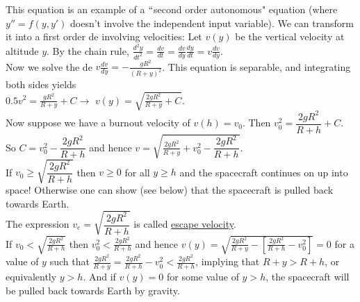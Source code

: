 \documentclass{ximera}
\begin{document}
 This equation is an example of a $``$second order autonomous" equation (where $y''=f(y,y')$ doesn't involve the independent input variable).   We can transform it into a first order de involving velocities: Let $v(y)$ be the vertical velocity at altitude $y$.   By the chain rule, $\displaystyle \frac{d^{2}y}{dt^{2}}=\frac{dv}{dt}=\frac{dv}{dy}\frac{dy}{dt}=v\frac{dv}{dy}$.\\


 Now we solve the de $\displaystyle v\frac{dv}{dy}=-\frac{gR^{2}}{(R+y)^{2}}$.  This equation is separable, and integrating both sides yields  \\ $\displaystyle 0.5v^{2}=\frac{gR^{2}}{R+y}+C\rightarrow$ $\displaystyle v(y)=\sqrt{\frac{2gR^{2}}{R+y}+C}$.\\


 Now suppose we have a burnout velocity of $v(h)=v_{0}$. Then $v_{0}^{2}=\dfrac{2gR^{2}}{R+h}+C$.\\

 So $C=v_{0}^{2}-\dfrac{2gR^{2}}{R+h}$  and hence $\displaystyle v=\sqrt{\frac{2gR^{2}}{R+y}+v_{0}^{2}-\dfrac{2gR^{2}}{R+h}}$.\\


 If $v_{0}\geq \sqrt{\dfrac{2gR^{2}}{R+h}}$ then $v\geq 0$ for all $y\geq h$ and the spacecraft continues on up into space!  Otherwise one can show (see below) that the spacecraft is pulled back towards Earth.\\

The expression $v_{e}=\sqrt{\dfrac{2gR^{2}}{R+h}}$ is called \underline{escape velocity}.\\

 If $\displaystyle v_{0} < \sqrt{\frac{2gR^2}{R+h}}$ then $\displaystyle v_{0}^{2} < \frac{2gR^2}{R+h}$ and hence $\displaystyle v(y)=\sqrt{\frac{2gR^2}{R+y}-\left[\frac{2gR^2}{R+h}-v_{0}^{2}\right]}=0$ for a value of $y$ such that $\displaystyle \frac{2gR^2}{R+y} = \frac{2gR^2}{R+h} - v_{0}^{2} < \frac{2gR^2}{R+h}$, implying that $R+y>R+h$, or equivalently $y>h$. And if $v(y)=0$ for some value of $y>h$, the spacecraft will be pulled back towards Earth by gravity. 
\end{document}
